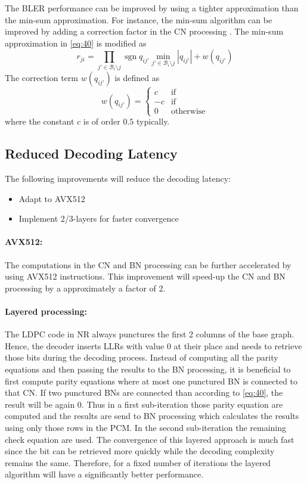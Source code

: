\documentclass{article}
\def\Bcal{\mathcal{B}}
\newcommand{\sgn}{\operatorname{sgn}}
\begin{document}
The BLER performance can be improved by using a tighter approximation than the min-sum approximation. For instance, the min-sum algorithm can be improved by adding a correction factor in the CN processing . The min-sum approximation in \eqref{eq:40} is modified as
\begin{equation}
  \label{eq:50}
  r_{ji} = \prod_{j'\in\Bcal_i\setminus j}\sgn q_{ij'}\min_{j'\in\Bcal_i\setminus j} |q_{ij'}| + w(q_{ij'})
\end{equation}
The correction term $w(q_{ij'})$ is defined as
\begin{equation}
  \label{eq:51}
  w(q_{ij'}) =
  \begin{cases}
     c & \textrm{if}~  \\
    -c & \textrm{if}~ \\
     0 & \textrm{otherwise}
  \end{cases}
\end{equation}
where the constant $c$ is of order $0.5$ typically.

\subsection{Reduced Decoding Latency}
\label{sec:reduc-decod-latency}

The following improvements will reduce the decoding latency:

\begin{itemize}
\item Adapt to AVX512
\item Implement 2/3-layers for faster convergence
\end{itemize}

\paragraph{AVX512:}
The computations in the CN and BN processing can be further accelerated by using AVX512 instructions. This improvement will speed-up the CN and BN processing by a approximately a factor of 2.

\paragraph{Layered processing:}
The LDPC code in NR always punctures the first 2 columns of the base graph. Hence, the decoder inserts LLRs with value 0 at their place and needs to retrieve those bits during the decoding process. Instead of computing all the parity equations and then passing the results to the BN processing, it is beneficial to first compute parity equations where at most one punctured BN is connected to that CN. If two punctured BNs are connected than according to \eqref{eq:40}, the result will be again 0. Thus in a first sub-iteration those parity equation are computed and the results are send to BN processing which calculates the results using only those rows in the PCM. In the second sub-iteration the remaining check equation are used.
The convergence of this layered approach is much fast since the bit can be retrieved more quickly while the decoding complexity remains the same. Therefore, for a fixed number of iterations the layered algorithm will have a significantly better performance.

\newpage


\end{document}
